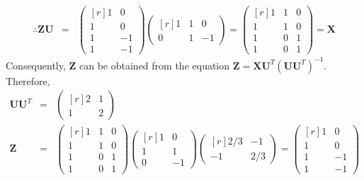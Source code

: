 \documentclass[12pt]{article} %
\begin{document}
\begin{enumerate}
\begin{itemize}
\begin{eqnarray*}
     	 \therefore \mathbf{ZU} &=&
     	 \begin{pmatrix}[r]
	     	1 & 0 \\
	     	1 & 0 \\
	     	1 & -1 \\
	     	1 & -1      	 
     	 \end{pmatrix}
     	 \begin{pmatrix}[r]
      	  1 & 1 &  0 \\
     	  0 & 1 & -1     	 
     	 \end{pmatrix}=
     	 \begin{pmatrix}[r]
     	 1 & 1 & 0 \\
     	 1 & 1 & 0 \\
     	 1 & 0 & 1 \\
     	 1 & 0 & 1 
     	 \end{pmatrix}=\mathbf{X}    	 
     	\end{eqnarray*}
     	Consequently, $\mathbf{Z}$ can be obtained from the equation $\mathbf{Z}=\mathbf{XU}^{T}(\mathbf{UU}^{T})^{-1}$. Therefore, 
     	\begin{eqnarray*}
     	 \mathbf{U}\mathbf{U}^{T}&=&
     	 \begin{pmatrix}[r]
     	 2 & 1 \\
     	 1 & 2 
     	 \end{pmatrix}\\
     	 \mathbf{Z}&=&
     	 \begin{pmatrix}[r]
     	  1 & 1 & 0 \\
     	  1 & 1 & 0 \\
     	  1 & 0 & 1 \\
     	  1 & 0 & 1  	  
     	 \end{pmatrix}
     	 \begin{pmatrix}[r]
     	 1 &  0 \\
     	 1 &  1 \\
     	 0 & -1
     	 \end{pmatrix}
     	 \begin{pmatrix}[r]
     	 2/3 & -1 \\
     	 -1 & 2/3      	 
     	 \end{pmatrix}=
     	 \begin{pmatrix}[r]
		    1 &  0 \\
		    1 &  0 \\
		    1 & -1 \\
		    1 & -1    	 
     	 \end{pmatrix}
     	\end{eqnarray*}

\end{itemize}
\end{enumerate}
\end{document}
